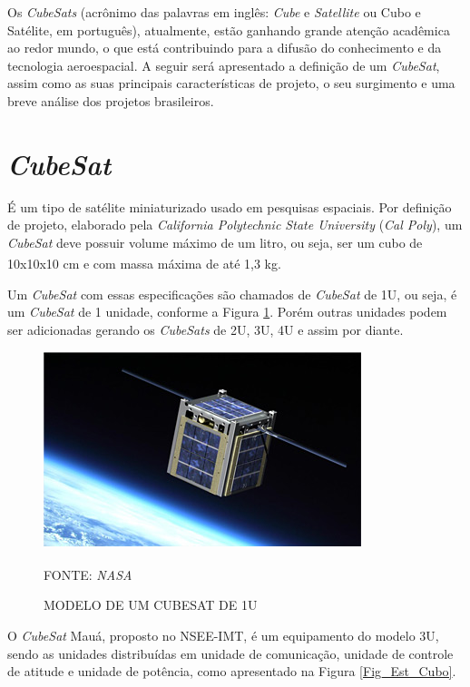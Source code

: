 \documentclass[
	12pt,				%
	openright,			%
	oneside,			%
	a4paper,			%
	english,			%
	french,				%
	spanish,			%
	brazil,				%
	oldfontcommands
	]{abntex2}
\begin{document}
	Os \textit{CubeSats} (acrônimo das palavras em inglês: \textit{Cube} e \textit{Satellite} ou Cubo e Satélite, em português), atualmente, estão ganhando grande atenção acadêmica ao redor mundo, o que está contribuindo para a difusão do conhecimento e da tecnologia aeroespacial. A seguir será apresentado a definição de um \textit{CubeSat}, assim como as suas principais características de projeto, o seu surgimento e uma breve análise dos projetos brasileiros. 

\section[CubeSat]{\textit{CubeSat}}

	É um tipo de satélite miniaturizado usado em pesquisas espaciais. Por definição de projeto, elaborado pela \textit{California Polytechnic State University} (\textit{Cal Poly}), um \textit{CubeSat} deve possuir volume máximo de um litro, ou seja, ser um cubo de 10x10x10 cm e com massa máxima de até 1,3 kg.\textsuperscript{\cite{CubeSat}}
	
	Um \textit{CubeSat} com essas especificações são chamados de \textit{CubeSat} de 1U, ou seja, é um \textit{CubeSat} de 1 unidade, conforme a Figura \ref{Fig_Cubo}. Porém outras unidades podem ser adicionadas gerando os \textit{CubeSats} de 2U, 3U, 4U e assim por diante.
	
	\begin{figure}[th]
		\caption{MODELO DE UM CUBESAT DE 1U}
		\label{Fig_Cubo}
		\centering
		\includegraphics[width=0.8\linewidth]{./figs/cubesat_01}
			
		\begin{small}
			FONTE: \textit{NASA}\textsuperscript{\cite{NASA}}
		\end{small}		
	\end{figure}
		
	O \textit{CubeSat} Mauá, proposto no NSEE-IMT, é um equipamento do modelo 3U, sendo as unidades distribuídas em unidade de comunicação, unidade de controle de atitude e unidade de potência, como apresentado na Figura \ref{Fig_Est_Cubo}.
	
\end{document}
